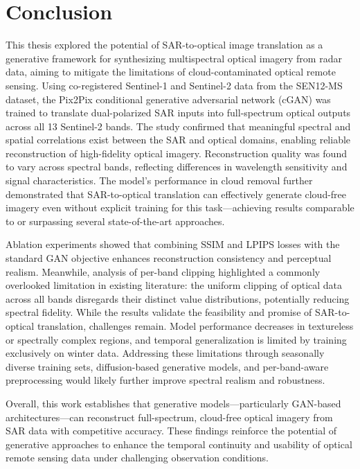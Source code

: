\chapter{Conclusion}
\label{chapter:conclusion}
This thesis explored the potential of SAR-to-optical image translation as a generative framework for synthesizing multispectral optical imagery from radar data, aiming to mitigate the limitations of cloud-contaminated optical remote sensing. Using co-registered Sentinel-1 and Sentinel-2 data from the SEN12-MS dataset, the Pix2Pix conditional generative adversarial network (cGAN) was trained to translate dual-polarized SAR inputs into full-spectrum optical outputs across all 13 Sentinel-2 bands.
The study confirmed that meaningful spectral and spatial correlations exist between the SAR and optical domains, enabling reliable reconstruction of high-fidelity optical imagery. Reconstruction quality was found to vary across spectral bands, reflecting differences in wavelength sensitivity and signal characteristics. The model’s performance in cloud removal further demonstrated that SAR-to-optical translation can effectively generate cloud-free imagery even without explicit training for this task—achieving results comparable to or surpassing several state-of-the-art approaches.

Ablation experiments showed that combining SSIM and LPIPS losses with the standard GAN objective enhances reconstruction consistency and perceptual realism. Meanwhile, analysis of per-band clipping highlighted a commonly overlooked limitation in existing literature: the uniform clipping of optical data across all bands disregards their distinct value distributions, potentially reducing spectral fidelity.
While the results validate the feasibility and promise of SAR-to-optical translation, challenges remain. Model performance decreases in textureless or spectrally complex regions, and temporal generalization is limited by training exclusively on winter data. Addressing these limitations through seasonally diverse training sets, diffusion-based generative models, and per-band-aware preprocessing would likely further improve spectral realism and robustness.

Overall, this work establishes that generative models—particularly GAN-based architectures—can reconstruct full-spectrum, cloud-free optical imagery from SAR data with competitive accuracy. These findings reinforce the potential of generative approaches to enhance the temporal continuity and usability of optical remote sensing data under challenging observation conditions.
